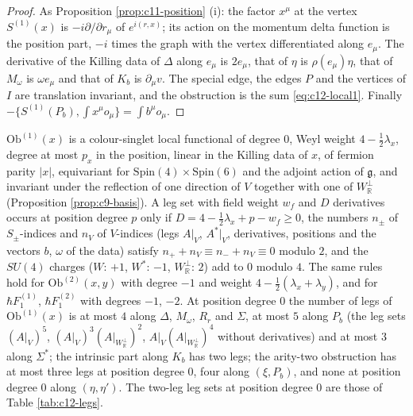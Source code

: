 \begin{proof}
As Proposition \ref{prop:c11-position} (i): the factor $x^\mu$ at the vertex $S^{(1)}(x)$ is $-i\partial/\partial r_\mu$ of $e^{i(r,x)}$; its action on the momentum delta function is the position part, $-i$ times the graph with the vertex differentiated along $e_\mu$. The derivative of the Killing data of $\Delta$ along $e_\mu$ is $2e_\mu$, that of $\eta$ is $\rho(e_\mu)\eta$, that of $M_\omega$ is $\omega e_\mu$ and that of $K_b$ is $\partial_\mu v$. The special edge, the edges $P$ and the vertices of $I$ are translation invariant, and the obstruction is the sum \eqref{eq:c12-local1}. Finally $-\{S^{(1)}(P_b),\int x^\mu o_\mu\}=\int b^\mu o_\mu$.
\end{proof}

\begin{theorem}
\label{thm:c12-bound}
$\mathrm{Ob}^{(1)}(x)$ is a colour-singlet local functional of degree $0$, Weyl weight $4-\tfrac12\lambda_x$, degree at most $p_x$ in the position, linear in the Killing data of $x$, of fermion parity $|x|$, equivariant for $\mathrm{Spin}(4)\times\mathrm{Spin}(6)$ and the adjoint action of $\mathfrak g$, and invariant under the reflection of one direction of $V$ together with one of $W_{\mathbb R}^\perp$ (Proposition \ref{prop:c9-basis}). A leg set with field weight $w_f$ and $D$ derivatives occurs at position degree $p$ only if $D=4-\tfrac12\lambda_x+p-w_f\ge0$, the numbers $n_\pm$ of $S_\pm$-indices and $n_V$ of $V$-indices (legs $A|_V$, $A^*|_V$, derivatives, positions and the vectors $b$, $\omega$ of the data) satisfy $n_++n_V\equiv n_-+n_V\equiv0$ modulo $2$, and the $SU(4)$ charges ($W$: $+1$, $W^*$: $-1$, $W_{\mathbb R}^\perp$: $2$) add to $0$ modulo $4$. The same rules hold for $\mathrm{Ob}^{(2)}(x,y)$ with degree $-1$ and weight $4-\tfrac12(\lambda_x+\lambda_y)$, and for $\hbar F_1^{(1)}$, $\hbar F_1^{(2)}$ with degrees $-1$, $-2$. At position degree $0$ the number of legs of $\mathrm{Ob}^{(1)}(x)$ is at most $4$ along $\Delta$, $M_\omega$, $R_r$ and $\Sigma$, at most $5$ along $P_b$ (the leg sets $(A|_V)^5$, $(A|_V)^3(A|_{W_{\mathbb R}^\perp})^2$, $A|_V(A|_{W_{\mathbb R}^\perp})^4$ without derivatives) and at most $3$ along $\Sigma^*$; the intrinsic part along $K_b$ has two legs; the arity-two obstruction has at most three legs at position degree $0$, four along $(\xi,P_b)$, and none at position degree $0$ along $(\eta,\eta')$. The two-leg leg sets at position degree $0$ are those of Table \ref{tab:c12-legs}.
\end{theorem}

